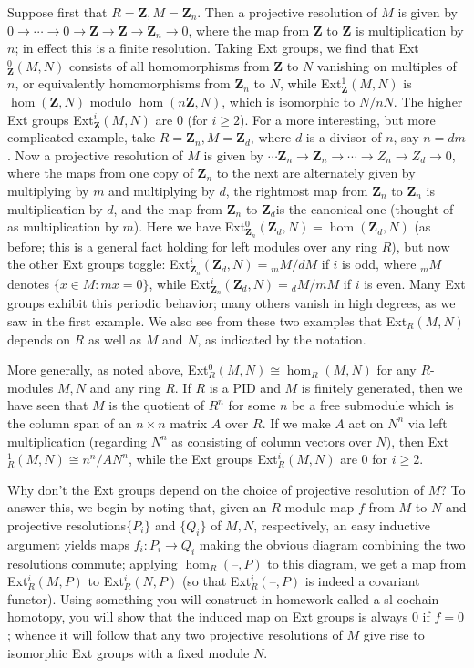 \documentclass[10pt]{article}
\begin{document}
Suppose first that $R = \mathbf Z, M = \mathbf Z_n$. Then a projective
resolution of $M$ is given by $0\rightarrow\cdots\rightarrow
0\rightarrow\mathbf Z\rightarrow\mathbf Z\rightarrow\mathbf
Z_n\rightarrow 0$, where the map from $\mathbf Z$ to $\mathbf Z$ is
multiplication by $n$; in effect this is a finite resolution. Taking Ext
groups, we find that Ext$_{\mathbf Z}^0(M,N)$ consists of all
homomorphisms from $\mathbf Z$ to $N$ vanishing on multiples of $n$, or
equivalently homomorphisms from $\mathbf Z_n$ to $N$, while
Ext$_{\mathbf Z}^1(M,N)$ is $\hom(\mathbf Z,N)$ modulo $\hom(n\mathbf
Z,N)$, which is isomorphic to $N/nN$. The higher Ext groups
Ext$_{\mathbf Z}^i(M,N)$ are 0 (for $i\ge2$). For a more interesting,
but more complicated example, take $R = \mathbf Z_n, M = \mathbf Z_d$,
where $d$ is a divisor of $n$, say $n=dm$. Now a projective resolution
of $M$ is given by $\cdots\mathbf Z_n\rightarrow\mathbf
Z_n\rightarrow\cdots\rightarrow Z_n\rightarrow Z_d\rightarrow 0$, where
the maps from one copy of $\mathbf Z_n$ to the next are alternately
given by multiplying by $m$ and multiplying by $d$, the rightmost map
from $\mathbf Z_n$ to $\mathbf Z_n$ is multiplication by $d$, and the
map from $\mathbf Z_n$ to $\mathbf Z_d$is the canonical one (thought of
as multiplication by $m$). Here we have Ext$_{\mathbf Z_n}^0(\mathbf
Z_d,N) = \hom(\mathbf Z_d,N)$ (as before; this is a general fact holding
for left modules over any ring $R$), but now the other Ext groups
toggle: Ext$_{\mathbf Z_n}^i(\mathbf Z_d,N) = {}_m M/dM$ if $i$ is odd,
where ${}_m M$ denotes $\{x\in M: mx = 0\}$, while Ext$_{\mathbf
  Z_n}^i(\mathbf Z_d,N) = {}_d M/mM$ if $i$ is even. Many Ext groups
exhibit this periodic behavior; many others vanish in high degrees, as
we saw in the first example. We also see from these two examples that
Ext$_R(M,N)$ depends on $R$ as well as $M$ and $N$, as indicated by the
notation.

More generally, as noted above, Ext$_R^0(M,N)\cong\hom_R(M,N)$ for any
$R$-modules $M,N$ and any ring $R$. If $R$ is a PID and $M$ is finitely
generated, then we have seen that $M$ is the quotient of $R^n$ for some
$n$ be a free submodule which is the column span of an $n\times n$
matrix $A$ over $R$. If we make $A$ act on $N^n$ via left multiplication
(regarding $N^n$ as consisting of column vectors over $N$), then
Ext$_R^1(M,N)\cong n^n/AN^n$, while the Ext groups Ext$_R^i(M,N)$ are 0
for $i\ge2$.

Why don't the Ext groups depend on the choice of projective resolution
of $M$? To answer this, we begin by noting that, given an $R$-module map
$f$ from $M$ to $N$ and projective resolutions$\{P_i\}$ and $\{Q_i\}$ of
$M,N$, respectively, an easy inductive argument yields maps
$f_i:P_i\rightarrow Q_i$ making the obvious diagram combining the two
resolutions commute; applying $\hom_R(\text{--},P)$ to this diagram, we
get a map from Ext$_R^i(M,P)$ to Ext$_R^i(N,P)$ (so that
Ext$_R^i(\text{--},P)$ is indeed a covariant functor). Using something
you will construct in homework called a {sl cochain homotopy}, you will
show that the induced map on Ext groups is always 0 if $f=0$; whence it
will follow that any two projective resolutions of $M$ give rise to
isomorphic Ext groups with a fixed module $N$.
\end{document}

